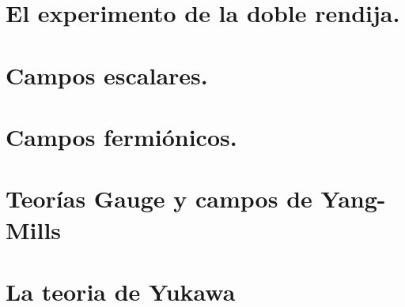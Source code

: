 \section{El experimento de la doble rendija.}

\section{Campos escalares.}
\section{Campos fermiónicos.}
\section{Teorías Gauge y campos de Yang-Mills}
\section{La teoria de Yukawa}